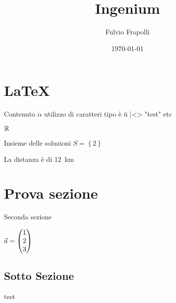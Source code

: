 \documentclass[]{article}
\title{Ingenium}
\author{Fulvio Frapolli}
\date{\today}
\begin{document}
\maketitle

\tableofcontents
\newpage



\section{\LaTeX}

Contenuto $\alpha$ utilizzo di caratteri tipo è ü |<> "test"
 etc

 $\mathbb{R}$ 



 Insieme delle soluzioni $S=\left\lbrace 2 \right\rbrace$

 La distanza è di \qty{12}{\km}    

\section{Prova sezione}

Seconda sezione

$\vec{a}=\vvec{1,2,3}$

\subsection{Sotto Sezione}

test
\end{document}
